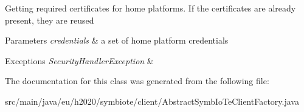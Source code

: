 Getting required certificates for home platforms. If the certificates are already present, they are reused


\begin{DoxyParams}{Parameters}
{\em credentials} & a set of home platform credentials \\
\hline
\end{DoxyParams}

\begin{DoxyExceptions}{Exceptions}
{\em Security\+Handler\+Exception} & \\
\hline
\end{DoxyExceptions}


The documentation for this class was generated from the following file\+:\begin{DoxyCompactItemize}
\item 
src/main/java/eu/h2020/symbiote/client/Abstract\+Symb\+Io\+Te\+Client\+Factory.\+java\end{DoxyCompactItemize}
